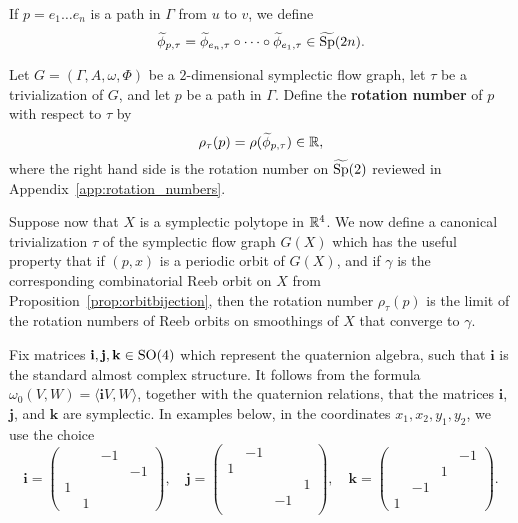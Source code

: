 If $p = e_1\dots e_n$ is a path in $\Gamma$ from $u$ to $v$, we define
\[
\widetilde{\phi}_{p,\tau} = \widetilde{\phi}_{e_n,\tau} \circ\cdots\circ \widetilde{\phi}_{e_1,\tau} \in \widetilde{\operatorname{Sp}}(2n).
\]

\begin{definition}
Let $G=(\Gamma,A,\omega,\Phi)$ be a $2$-dimensional symplectic flow graph, let $\tau$ be a trivialization of $G$, and let $p$ be a path in $\Gamma$. Define the {\bf rotation number\/} of $p$ with respect to $\tau$ by
\[
\rho_\tau(p) = \rho(\widetilde{\phi}_{p,\tau})\in{\mathbb R},
\]
where the right hand side is the rotation number on $\widetilde{\operatorname{Sp}}(2)$ reviewed in Appendix~\ref{app:rotation_numbers}. 
\end{definition}

Suppose now that $X$ is a symplectic polytope in ${\mathbb R}^4$. We now define a canonical trivialization $\tau$ of the symplectic flow graph $G(X)$ which has the useful property that if $(p,x)$ is a periodic orbit of $G(X)$, and if $\gamma$ is the corresponding combinatorial Reeb orbit on $X$ from Proposition~\ref{prop:orbitbijection}, then the rotation number $\rho_\tau(p)$ is the limit of the rotation numbers of Reeb orbits on smoothings of $X$ that converge to $\gamma$.

Fix matrices ${\mathbf i}, {\mathbf j}, {\mathbf k} \in \operatorname{SO}(4)$ which represent the quaternion algebra, such that ${\mathbf i}$ is the standard almost complex structure. It follows from the formula $\omega_0(V,W)=\langle {\mathbf i}V,W\rangle$, together with the quaternion relations, that the matrices ${\mathbf i}$, ${\mathbf j}$, and ${\mathbf k}$ are symplectic. In examples below, in the coordinates $x_1,x_2,y_1,y_2$, we use the choice
\[
{\mathbf i} = \begin{pmatrix} & & -1 & \\ & & & -1 \\ 1 & & & \\ & 1 & &\end{pmatrix}, \quad {\mathbf j} = \begin{pmatrix} & -1 & & \\ 1 & & & \\ & & & 1 \\ & & -1 & \\ \end{pmatrix}, \quad {\mathbf k} = \begin{pmatrix} & & & -1 \\ & & 1 & \\ & -1 & & \\ 1 & & & \end{pmatrix}.
\]

